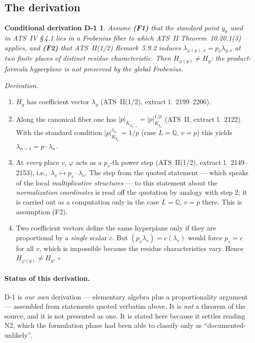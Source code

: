 \documentclass[11pt,a4paper]{article}
\theoremstyle{definition}
\theoremstyle{plain}
\newtheorem*{derivationD}{Conditional derivation D-1}
\theoremstyle{definition}
\newcommand{\anchor}[2]{(#1, extract l.~#2)}
\begin{document}
\subsection{The derivation}

\begin{derivationD}
Assume \textbf{(F1)} that the standard point $y_0$ used in ATS~IV \S\,4.1 lies in a
Frobenius fiber to which ATS~II Theorem~10.20.1(3) applies, and \textbf{(F2)} that
ATS~II(1/2) Remark~5.9.2 induces $\lambda_{\varphi(y),v} = p_v \lambda_{y,v}$ at two
finite places of distinct residue characteristic. Then
$H_{\varphi(y)} \neq H_y$: the product-formula hyperplane is not preserved by the
global Frobenius.
\end{derivationD}

\noindent\emph{Derivation.}
\begin{enumerate}
\item $H_y$ has coefficient vector $\lambda_y$
  \anchor{ATS~II(1/2)}{2199--2206}.
\item Along the canonical fiber one has
  $|p|_{K_{y_{n-1}}} = |p|^{1/p}_{K_{y_n}}$ \anchor{ATS~II}{2122}. With the
  standard condition $|p|^{\lambda_n}_{K_{y_n}} = 1/p$ (case $L = \mathbb{Q}$,
  $v = p$) this yields $\lambda_{n-1} = p \cdot \lambda_n$.
\item At \emph{every} place $v$, $\varphi$ acts as a $p_v$-th power step
  \anchor{ATS~II(1/2)}{2149--2153}, i.e.,\ $\lambda_v \mapsto p_v \cdot \lambda_v$.
  The step from the quoted statement --- which speaks of the local
  \emph{multiplicative structures} --- to this statement about the
  \emph{normalization coordinates} is read off the quotation by analogy with
  step 2; it is carried out as a computation only in the case $L = \mathbb{Q}$,
  $v = p$ there. This is assumption (F2).
\item Two coefficient vectors define the same hyperplane only if they are
  proportional by a \emph{single} scalar $c$. But $(p_v \lambda_v) = c(\lambda_v)$
  would force $p_v = c$ for all $v$, which is impossible because the residue
  characteristics vary. Hence $H_{\varphi(y)} \neq H_y$. \hfill$\square$
\end{enumerate}

\paragraph{Status of this derivation.}
D-1 is \emph{our own} derivation --- elementary algebra plus a proportionality
argument --- assembled from statements quoted verbatim above. It is \emph{not} a
theorem of the source, and it is not presented as one. It is stated here because
it settles reading N2, which the formulation phase had been able to classify only
as ``documented-unlikely''.
\end{document}
